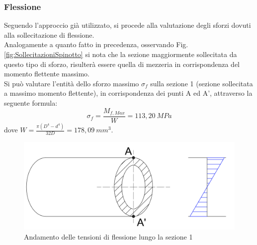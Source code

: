 \subsubsection{Flessione}
Seguendo l'approccio già utilizzato, si procede alla valutazione degli sforzi dovuti alla sollecitazione di flessione. \\
Analogamente a quanto fatto in precedenza, osservando Fig.\ref{fig:SollecitazioniSpinotto} si nota che la sezione maggiormente sollecitata da questo tipo di sforzo, risulterà essere quella di mezzeria in corrispondenza del momento flettente massimo.\\
Si può valutare l'entità dello sforzo massimo $\sigma_f$ sulla sezione 1 (sezione sollecitata a massimo momento flettente), in corrispondenza dei punti A ed A', attraverso la seguente formula:
\begin{equation}
    \sigma_f=\frac{M_{f,Max}}{W}=113,20\ MPa
\end{equation}
dove $W=\frac{\pi\left(D^4-d^4\right)}{32D}=178,09\ mm^3$.
\newpage
\begin{figure}[h]
    \centering
    \includegraphics[scale=0.5]{Immagini/FlessioneSezioneSpinotto1.png}
    \caption{Andamento delle tensioni di flessione lungo la sezione 1}
    \label{fig:FlessioneSezioneSpinotto1}
\end{figure}
